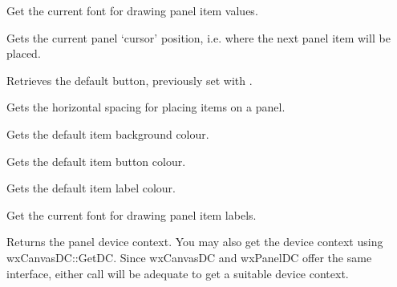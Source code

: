 

Get the current font for drawing panel item values.



Gets the current panel `cursor' position, i.e. where the next panel item
will be placed.

\label{wxpanelgetdefaultitem}


Retrieves the default button, previously set with .



Gets the horizontal spacing for placing items on a panel.



Gets the default item background colour.



Gets the default item button colour.



Gets the default item label colour.



Get the current font for drawing panel item labels.

\label{wxpanelgetpaneldc}


Returns the panel device context. You may also get the device context
using wxCanvasDC::GetDC. Since wxCanvasDC and wxPanelDC offer the same
interface, either call will be adequate to get a suitable device context.


